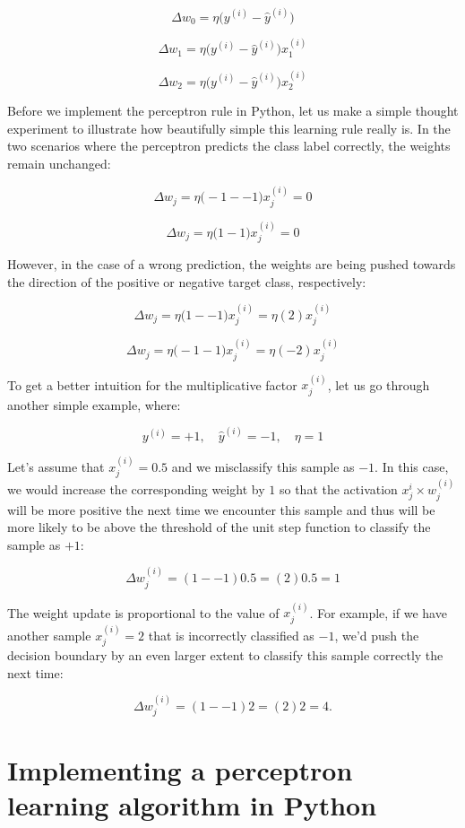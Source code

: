 \documentclass[letterpaper]{report}
\begin{document}
\[
\Delta w_0 = \eta \bigg(  y^{(i)} - \hat{y}^{(i)} \bigg) 
\]

\[
\Delta w_1 = \eta \bigg(  y^{(i)} - \hat{y}^{(i)} \bigg) x_{1}^{(i)}
\]

\[
\Delta w_2 = \eta \bigg(  y^{(i)} - \hat{y}^{(i)} \bigg) x_{2}^{(i)}
\]

Before we implement the perceptron rule in Python, let us make a simple thought experiment to illustrate how beautifully simple this learning rule really is. In the two scenarios where the perceptron predicts the class label correctly, the weights remain unchanged:

\[
\Delta w_j = \eta \bigg( -1 -- 1 \bigg)x_{j}^{(i)} = 0
\]

\[
\Delta w_j = \eta \bigg( 1-1 \bigg)x_{j}^{(i)} = 0
\]

However, in the case of a wrong prediction, the weights are being pushed towards the direction of the positive or negative target class, respectively:

\[
\Delta w_j = \eta \bigg( 1 -- 1 \bigg)x_{j}^{(i)} = \eta(2)x_{j}^{(i)}
\]

\[
\Delta w_j = \eta \bigg( -1-1 \bigg)x_{j}^{(i)} = \eta(-2)x_{j}^{(i)}
\]


To get a better intuition for the multiplicative factor $x_{j}^{(i)}$, let us go through another
simple example, where:

\[
y^{(i)} = +1, \quad \hat{y}^{(i)} = -1, \quad \eta = 1
 \]

Let's assume that $x_{j}^{(i)}=0.5$ and we misclassify this sample as $-1$. In this case, we would increase the corresponding weight by $1$ so that the activation $x_{j}^{i} \times w_{j}^{(i)}$ will be more positive the next time we encounter this sample and thus will be more likely to be above the threshold of the unit step function to classify the sample as  $+1$:

\[
\Delta w_{j}^{(i)} = (1--1)0.5 = (2)0.5 = 1
\]

The weight update is proportional to the value of $x_{j}^{(i)}$. For example, if we have another sample $x_{j}^{(i)}=2$ that is incorrectly classified as $-1$, we'd push the decision boundary by an even larger extent to classify this sample correctly the next time:

\[
\Delta w_{j}^{(i)} = (1--1)2 = (2)2 = 4.
\]


\section{Implementing a perceptron learning algorithm in Python}
\end{document}
